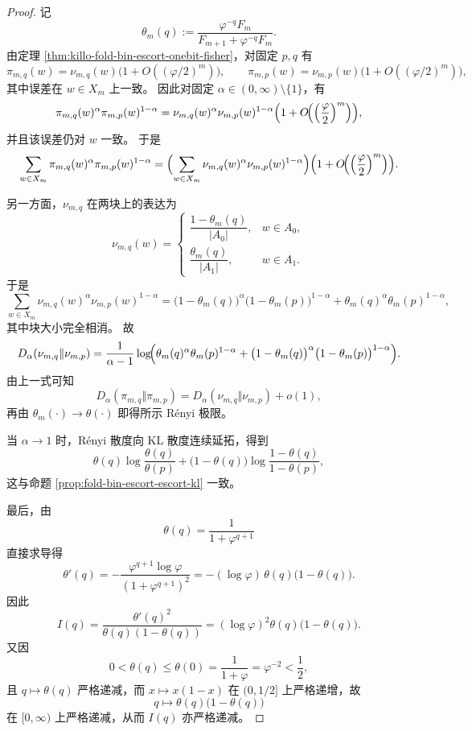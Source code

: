 \begin{proof}
记
\[
\theta_m(q):=\frac{\varphi^{-q}F_m}{F_{m+1}+\varphi^{-q}F_m}.
\]
由定理 \ref{thm:killo-fold-bin-escort-onebit-fisher}，对固定 \(p,q\) 有
\[
\pi_{m,q}(w)=\nu_{m,q}(w)\bigl(1+O((\varphi/2)^m)\bigr),
\qquad
\pi_{m,p}(w)=\nu_{m,p}(w)\bigl(1+O((\varphi/2)^m)\bigr),
\]
其中误差在 \(w\in X_m\) 上一致。
因此对固定 \(\alpha\in(0,\infty)\setminus\{1\}\)，有
\[
\pi_{m,q}(w)^\alpha\pi_{m,p}(w)^{1-\alpha}
=
\nu_{m,q}(w)^\alpha\nu_{m,p}(w)^{1-\alpha}
\Bigl(1+O\!\Bigl(\Bigl(\frac{\varphi}{2}\Bigr)^m\Bigr)\Bigr),
\]
并且该误差仍对 \(w\) 一致。
于是
\[
\sum_{w\in X_m}\pi_{m,q}(w)^\alpha\pi_{m,p}(w)^{1-\alpha}
=
\Bigl(\sum_{w\in X_m}\nu_{m,q}(w)^\alpha\nu_{m,p}(w)^{1-\alpha}\Bigr)
\Bigl(1+O\!\Bigl(\Bigl(\frac{\varphi}{2}\Bigr)^m\Bigr)\Bigr).
\]

另一方面，\(\nu_{m,q}\) 在两块上的表达为
\[
\nu_{m,q}(w)=
\begin{cases}
\dfrac{1-\theta_m(q)}{|A_0|}, & w\in A_0,\\[2ex]
\dfrac{\theta_m(q)}{|A_1|}, & w\in A_1.
\end{cases}
\]
于是
\[
\sum_{w\in X_m}\nu_{m,q}(w)^\alpha\nu_{m,p}(w)^{1-\alpha}
=
\bigl(1-\theta_m(q)\bigr)^\alpha\bigl(1-\theta_m(p)\bigr)^{1-\alpha}
+
\theta_m(q)^\alpha\theta_m(p)^{1-\alpha},
\]
其中块大小完全相消。
故
\[
D_\alpha(\nu_{m,q}\Vert \nu_{m,p})
=
\frac{1}{\alpha-1}
\log\!\Bigl(
\theta_m(q)^\alpha\theta_m(p)^{1-\alpha}
+
\bigl(1-\theta_m(q)\bigr)^\alpha\bigl(1-\theta_m(p)\bigr)^{1-\alpha}
\Bigr).
\]
由上一式可知
\[
D_\alpha(\pi_{m,q}\Vert \pi_{m,p})
=
D_\alpha(\nu_{m,q}\Vert \nu_{m,p})+o(1),
\]
再由 \(\theta_m(\cdot)\to \theta(\cdot)\) 即得所示 Rényi 极限。

当 \(\alpha\to 1\) 时，Rényi 散度向 KL 散度连续延拓，得到
\[
\theta(q)\log\frac{\theta(q)}{\theta(p)}
+
\bigl(1-\theta(q)\bigr)\log\frac{1-\theta(q)}{1-\theta(p)},
\]
这与命题 \ref{prop:fold-bin-escort-escort-kl} 一致。

最后，由
\[
\theta(q)=\frac{1}{1+\varphi^{q+1}}
\]
直接求导得
\[
\theta'(q)
=
-\frac{\varphi^{q+1}\log\varphi}{(1+\varphi^{q+1})^2}
=
-(\log\varphi)\,\theta(q)\bigl(1-\theta(q)\bigr).
\]
因此
\[
I(q)=\frac{\theta'(q)^2}{\theta(q)(1-\theta(q))}
=(\log\varphi)^2\theta(q)\bigl(1-\theta(q)\bigr).
\]
又因
\[
0<\theta(q)\le \theta(0)=\frac{1}{1+\varphi}=\varphi^{-2}<\frac12,
\]
且 \(q\mapsto \theta(q)\) 严格递减，而 \(x\mapsto x(1-x)\) 在 \((0,1/2]\) 上严格递增，故
\[
q\mapsto \theta(q)\bigl(1-\theta(q)\bigr)
\]
在 \([0,\infty)\) 上严格递减，从而 \(I(q)\) 亦严格递减。
\end{proof}

\endinput
